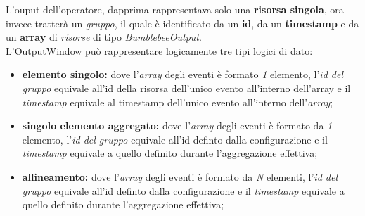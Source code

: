 L'ouput dell'operatore, dapprima rappresentava solo una \textbf{risorsa singola}, ora invece tratterà un \textit{gruppo}, il quale è identificato da un \textbf{id}, da un \textbf{\gls{timestamp}} e da un \textbf{array} di \textit{risorse} di tipo \textit{BumblebeeOutput}.\\
L'OutputWindow può rappresentare logicamente tre tipi logici di dato:
\begin{itemize}
	\item{\textbf{elemento singolo:} dove l'\textit{array} degli eventi è formato \textit{1} elemento, l'\textit{id del gruppo} equivale all'id della risorsa dell'unico evento all'interno dell'array e il \textit{\gls{timestamp}} equivale al \gls{timestamp} dell'unico evento all'interno dell'\textit{array};}
	\item{\textbf{singolo elemento aggregato:} dove l'\textit{array} degli eventi è formato da \textit{1} elemento, l'\textit{id del gruppo} equivale all'id definto dalla configurazione e il \textit{\gls{timestamp}} equivale a quello definito durante l'aggregazione effettiva;}
	\item{\textbf{allineamento:} dove l'\textit{array} degli eventi è formato da \textit{N} elementi, l'\textit{id del gruppo} equivale all'id definto dalla configurazione e il \textit{\gls{timestamp}} equivale a quello definito durante l'aggregazione effettiva;}
\end{itemize}



